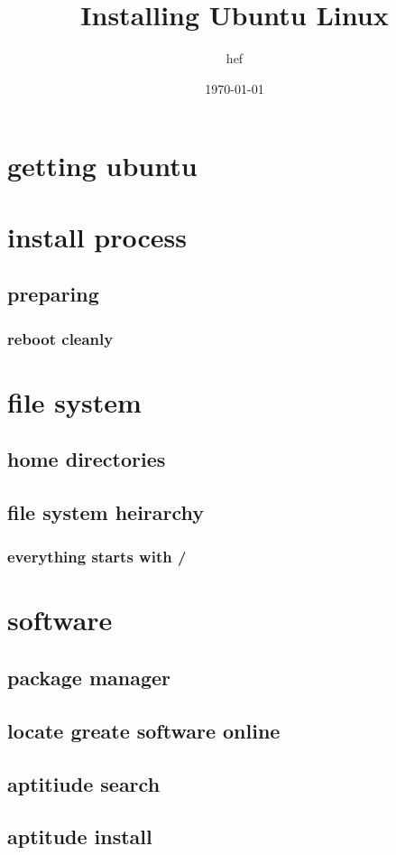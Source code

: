 \documentclass[hyperref={pdfpagelabels=false}]{beamer}
\title{Installing Ubuntu Linux}
\author{hef}
\date{\today}
\begin{document}
\frame{\titlepage}
\section[outline]{}
\frame{\tableofcontents}
\section{getting ubuntu}
\section{install process}
\subsection{preparing}
\frame
{
    \frametitle{reboot cleanly}
}
\section{file system}
\subsection{home directories}
\subsection{file system heirarchy}
\frame
{
    \frametitle{everything starts with /}
    
}
\section{software}
\subsection{package manager}
\subsection{locate greate software online}
\subsection{aptitiude search}
\subsection{aptitude install}
\end{document}
